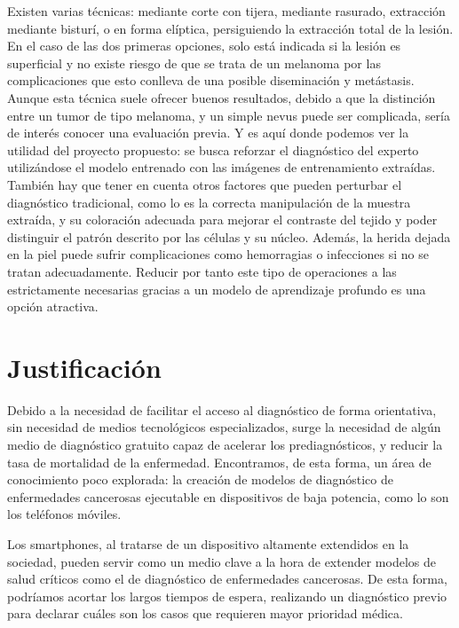 Existen varias técnicas: mediante corte con tijera, mediante rasurado, extracción mediante bisturí, o en forma elíptica, persiguiendo la extracción total de la lesión. En el caso de las dos primeras opciones, solo está indicada si la lesión es superficial y no existe riesgo de que se trata de un melanoma por las complicaciones que esto conlleva de una posible diseminación y metástasis. \\

Aunque esta técnica suele ofrecer buenos resultados, debido a que la distinción entre un tumor de tipo melanoma, y un simple nevus puede ser complicada, sería de interés conocer una evaluación previa. Y es aquí donde podemos ver la utilidad del proyecto propuesto: se busca reforzar el diagnóstico del experto utilizándose el modelo entrenado con las imágenes de entrenamiento extraídas.\\

También hay que tener en cuenta otros factores que pueden perturbar el diagnóstico tradicional, como lo es la correcta manipulación de la muestra extraída, y su coloración adecuada para mejorar el contraste del tejido y poder distinguir el patrón descrito por las células y su núcleo. Además, la herida dejada en la piel puede sufrir complicaciones como hemorragias o infecciones si no se tratan adecuadamente. Reducir por tanto este tipo de operaciones a las estrictamente necesarias gracias a un modelo de aprendizaje profundo es una opción atractiva.

\section{Justificación}

Debido a la necesidad de facilitar el acceso al diagnóstico de forma orientativa, sin necesidad  de medios tecnológicos especializados, surge la necesidad de algún medio de diagnóstico gratuito capaz de acelerar los prediagnósticos, y reducir la tasa de mortalidad de la enfermedad. Encontramos, de esta forma, un área de conocimiento poco explorada: la creación de modelos de diagnóstico de enfermedades cancerosas ejecutable en dispositivos de baja potencia, como lo son los teléfonos móviles.

Los smartphones, al tratarse de un dispositivo altamente extendidos en la sociedad, pueden servir como un medio clave a la hora de extender modelos de salud críticos como el de diagnóstico de enfermedades cancerosas. De esta forma, podríamos acortar los largos tiempos de espera, realizando un diagnóstico previo para declarar cuáles son los casos que requieren mayor prioridad médica.

